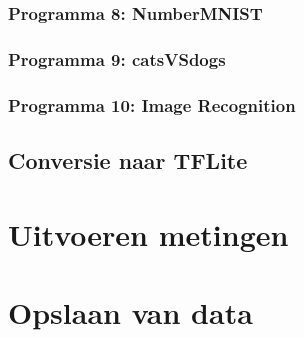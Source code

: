 		\subsubsection{Programma 8: NumberMNIST}
		\subsubsection{Programma 9: catsVSdogs}
		\subsubsection{Programma 10: Image Recognition}
	\subsection{Conversie naar TFLite}
\section{Uitvoeren metingen}


\section{Opslaan van data}
